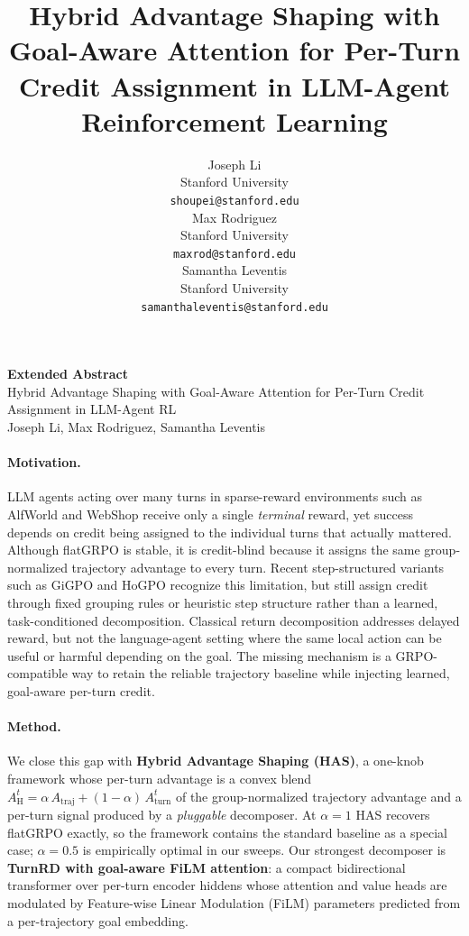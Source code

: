 \documentclass{article}
\title{Hybrid Advantage Shaping with Goal-Aware Attention for Per-Turn Credit Assignment in LLM-Agent Reinforcement Learning}
\author{%
  Joseph Li \\
  Stanford University \\
  \texttt{shoupei@stanford.edu} \\
  \And
  Max Rodriguez \\
  Stanford University \\
  \texttt{maxrod@stanford.edu} \\
  \And
  Samantha Leventis \\
  Stanford University \\
  \texttt{samanthaleventis@stanford.edu} \\
}
\newcommand{\Atraj}{A_{\text{traj}}}
\newcommand{\Aturn}{A_{\text{turn}}}
\newcommand{\AH}{A_{\text{H}}}
\begin{document}
\begin{titlepage}
\begin{center}
\Large\textbf{Extended Abstract}\\[2pt]
\normalsize Hybrid Advantage Shaping with Goal-Aware Attention for Per-Turn Credit Assignment in LLM-Agent RL\\
\small Joseph Li, Max Rodriguez, Samantha Leventis
\end{center}
\vspace{6pt}

\paragraph{Motivation.}
LLM agents acting over many turns in sparse-reward environments such as AlfWorld and WebShop
receive only a single \emph{terminal} reward, yet success depends on credit being assigned to
the individual turns that actually mattered. Although flatGRPO is stable, it is credit-blind
because it assigns the same group-normalized trajectory advantage to every turn. Recent
step-structured variants such as GiGPO and HoGPO recognize this limitation, but still assign
credit through fixed grouping rules or heuristic step structure rather than a learned,
task-conditioned
decomposition. Classical return decomposition addresses delayed reward, but not the
language-agent setting where the same local action can be useful or harmful depending on the
goal. The missing mechanism is a GRPO-compatible way to retain the reliable trajectory
baseline while injecting learned, goal-aware per-turn credit.

\paragraph{Method.}
We close this gap with \textbf{Hybrid Advantage Shaping (HAS)}, a one-knob framework whose
per-turn advantage is a convex blend $\AH^{t} = \alpha\,\Atraj + (1-\alpha)\,\Aturn^{t}$ of
the group-normalized trajectory advantage and a per-turn signal produced by a \emph{pluggable}
decomposer. At $\alpha{=}1$ HAS recovers flatGRPO exactly, so the framework contains the
standard baseline as a special case; $\alpha{=}0.5$ is empirically optimal in our sweeps.
Our strongest decomposer is \textbf{TurnRD with goal-aware FiLM attention}: a compact
bidirectional transformer over per-turn encoder hiddens whose attention and value heads are
modulated by Feature-wise Linear Modulation (FiLM) parameters predicted from a
per-trajectory goal embedding.


\end{titlepage}
\end{document}
